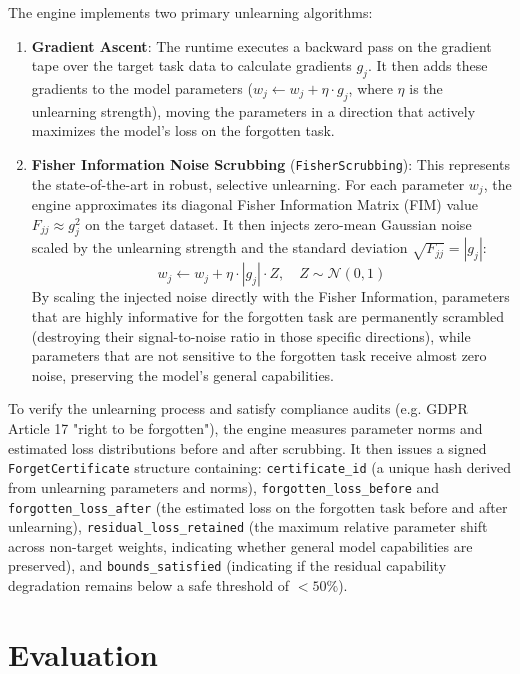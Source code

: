 \documentclass[11pt,a4paper]{article}
\begin{document}
The engine implements two primary unlearning algorithms:
\begin{enumerate}[itemsep=2pt]
  \item \textbf{Gradient Ascent}: The runtime executes a backward pass on the gradient tape over the target task data to calculate gradients $g_j$. It then adds these gradients to the model parameters ($w_j \leftarrow w_j + \eta \cdot g_j$, where $\eta$ is the unlearning strength), moving the parameters in a direction that actively maximizes the model's loss on the forgotten task.
  \item \textbf{Fisher Information Noise Scrubbing} (\texttt{FisherScrubbing}): This represents the state-of-the-art in robust, selective unlearning. For each parameter $w_j$, the engine approximates its diagonal Fisher Information Matrix (FIM) value $F_{jj} \approx g_j^2$ on the target dataset. It then injects zero-mean Gaussian noise scaled by the unlearning strength and the standard deviation $\sqrt{F_{jj}} = |g_j|$:
   $$w_j \leftarrow w_j + \eta \cdot |g_j| \cdot Z, \quad Z \sim \mathcal{N}(0, 1)$$
   By scaling the injected noise directly with the Fisher Information, parameters that are highly informative for the forgotten task are permanently scrambled (destroying their signal-to-noise ratio in those specific directions), while parameters that are not sensitive to the forgotten task receive almost zero noise, preserving the model's general capabilities.
\end{enumerate}

To verify the unlearning process and satisfy compliance audits (e.g. GDPR Article 17 "right to be forgotten"), the engine measures parameter norms and estimated loss distributions before and after scrubbing. It then issues a signed \texttt{ForgetCertificate} structure containing: \texttt{certificate\_id} (a unique hash derived from unlearning parameters and norms), \texttt{forgotten\_loss\_before} and \texttt{forgotten\_loss\_after} (the estimated loss on the forgotten task before and after unlearning), \texttt{residual\_loss\_retained} (the maximum relative parameter shift across non-target weights, indicating whether general model capabilities are preserved), and \texttt{bounds\_satisfied} (indicating if the residual capability degradation remains below a safe threshold of $< 50\%$).


\section{Evaluation}
\end{document}
